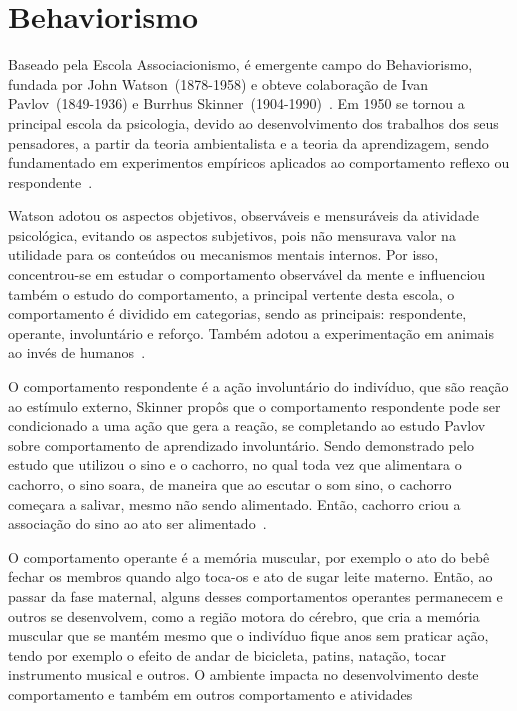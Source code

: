 \section{Behaviorismo}\label{behaviorismo}

Baseado pela Escola Associacionismo, é emergente campo do Behaviorismo, fundada por John Watson~(1878-1958) e obteve colaboração de Ivan Pavlov~(1849-1936) e Burrhus Skinner~(1904-1990)~\cite{hothersall1997historia,sternberg2000psicologia}.
Em 1950 se tornou a principal escola da psicologia, devido ao desenvolvimento dos trabalhos dos seus pensadores, a partir da teoria ambientalista e a teoria da aprendizagem, sendo fundamentado em experimentos empíricos aplicados ao comportamento reflexo ou respondente~\cite{bock1999psicologias}.

Watson adotou os aspectos objetivos, observáveis e mensuráveis da atividade psicológica, evitando os aspectos subjetivos, pois não mensurava valor na utilidade para os conteúdos ou mecanismos mentais internos. 
Por isso, concentrou-se em estudar o comportamento observável da mente e influenciou também o estudo do comportamento, a principal vertente desta escola, o comportamento é dividido em categorias, sendo as principais: respondente, operante, involuntário e reforço.
Também adotou a experimentação em animais ao invés de humanos~\cite{bock1999psicologias,sternberg2000psicologia}.

O comportamento respondente é a ação involuntário do indivíduo, que são reação ao estímulo externo, Skinner propôs que o comportamento respondente pode ser condicionado a uma ação que gera a reação, se completando ao estudo Pavlov sobre comportamento de aprendizado involuntário.
Sendo demonstrado pelo estudo que utilizou o sino e o cachorro, no qual toda vez que alimentara o cachorro, o sino soara, de maneira que ao escutar o som sino, o cachorro começara a salivar, mesmo não sendo alimentado.
Então, cachorro criou a associação do sino ao ato ser alimentado~\cite{sternberg2000psicologia,silva2007psicologia_educacao}. 

O comportamento operante é a memória muscular, por exemplo o ato do bebê fechar os membros quando algo toca-os e ato de sugar leite materno.
Então, ao passar da fase maternal, alguns desses comportamentos operantes permanecem e outros se desenvolvem, como a região motora do cérebro, que cria a memória muscular que se mantém mesmo que o indivíduo fique anos sem praticar ação, tendo por exemplo o efeito de andar de bicicleta, patins, natação, tocar instrumento musical e outros. 
O ambiente impacta no desenvolvimento deste comportamento e também em outros comportamento e atividades~\cite{bock1999psicologias}

